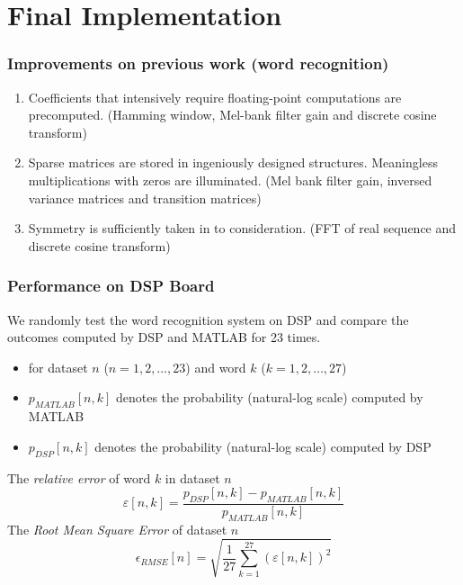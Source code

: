 \section{Final Implementation}


\begin{frame}
\frametitle{Improvements on previous work (word recognition)}
\begin{enumerate}
\item Coefficients that intensively require floating-point computations are precomputed. (Hamming window, Mel-bank filter gain and discrete cosine transform)
\item Sparse matrices are stored in ingeniously designed structures. Meaningless multiplications with zeros are illuminated. (Mel bank filter gain, inversed variance matrices and transition matrices)
\item Symmetry is sufficiently taken in to consideration. (FFT of real sequence and discrete cosine transform)
\end{enumerate}
\end{frame}


\begin{frame}
\frametitle{Performance on DSP Board}
We randomly test the word recognition system on DSP and compare the outcomes computed by DSP and MATLAB for 23 times.
\begin{itemize}
	\item for dataset $n$ ($n = 1, 2, \dots, 23$) and word $k$ ($k = 1, 2, \dots, 27$)
	\item $p_{MATLAB}[n, k]$ denotes the probability (natural-log scale) computed by MATLAB
	\item $p_{DSP}[n, k]$ denotes the probability (natural-log scale) computed by DSP
\end{itemize}

The \textit{relative error} of word $k$ in dataset $n$
\begin{equation}
\varepsilon[n, k] = \frac{p_{DSP}[n, k] - p_{MATLAB}[n, k]}{p_{MATLAB}[n, k]}
\end{equation}
The \textit{Root Mean Square Error} of dataset $n$
\begin{equation}
\epsilon_{RMSE}[n] = \sqrt{\frac{1}{27} \sum_{k = 1}^{27} (\varepsilon[n, k])^2}
\end{equation}
\end{frame}

